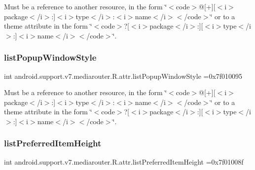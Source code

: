 Must be a reference to another resource, in the form \char`\"{}$<$code$>$@\mbox{[}+\mbox{]}\mbox{[}$<$i$>$package$<$/i$>$\+:\mbox{]}$<$i$>$type$<$/i$>$\+:$<$i$>$name$<$/i$>$$<$/code$>$\char`\"{} or to a theme attribute in the form \char`\"{}$<$code$>$?\mbox{[}$<$i$>$package$<$/i$>$\+:\mbox{]}\mbox{[}$<$i$>$type$<$/i$>$\+:\mbox{]}$<$i$>$name$<$/i$>$$<$/code$>$\char`\"{}. \mbox{\label{classandroid_1_1support_1_1v7_1_1mediarouter_1_1R_1_1attr_a8fe9c7c02eb28bd85a85c0e42f4624c4}} 
\subsubsection{\texorpdfstring{list\+Popup\+Window\+Style}{listPopupWindowStyle}}
{\footnotesize\ttfamily int android.\+support.\+v7.\+mediarouter.\+R.\+attr.\+list\+Popup\+Window\+Style =0x7f010095\hspace{0.3cm}{\ttfamily [static]}}

Must be a reference to another resource, in the form \char`\"{}$<$code$>$@\mbox{[}+\mbox{]}\mbox{[}$<$i$>$package$<$/i$>$\+:\mbox{]}$<$i$>$type$<$/i$>$\+:$<$i$>$name$<$/i$>$$<$/code$>$\char`\"{} or to a theme attribute in the form \char`\"{}$<$code$>$?\mbox{[}$<$i$>$package$<$/i$>$\+:\mbox{]}\mbox{[}$<$i$>$type$<$/i$>$\+:\mbox{]}$<$i$>$name$<$/i$>$$<$/code$>$\char`\"{}. \mbox{\label{classandroid_1_1support_1_1v7_1_1mediarouter_1_1R_1_1attr_aa9a404fba2eca8bca49c55849a05e777}} 
\subsubsection{\texorpdfstring{list\+Preferred\+Item\+Height}{listPreferredItemHeight}}
{\footnotesize\ttfamily int android.\+support.\+v7.\+mediarouter.\+R.\+attr.\+list\+Preferred\+Item\+Height =0x7f01008f\hspace{0.3cm}{\ttfamily [static]}}

